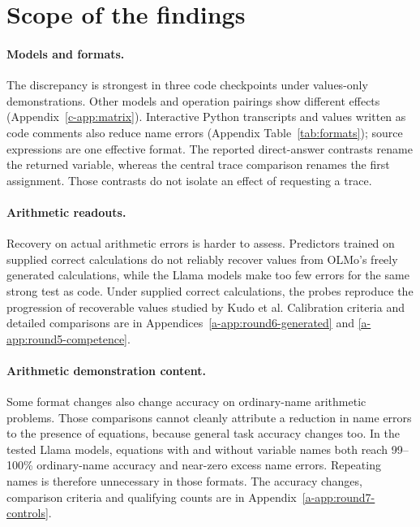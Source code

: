\documentclass[11pt]{article}
\begin{document}
\section{Scope of the findings}
\label{sec:scope}

\paragraph{Models and formats.} The discrepancy is strongest in three code
checkpoints under values-only demonstrations. Other models and operation
pairings show different effects (Appendix~\ref{c-app:matrix}). Interactive
Python transcripts and values written as code comments also reduce name errors
(Appendix Table~\ref{tab:formats}); source expressions are one effective format.
The reported direct-answer contrasts rename the returned variable, whereas
the central trace comparison renames the first assignment.
Those contrasts do not isolate an effect of requesting a trace.

\paragraph{Arithmetic readouts.} Recovery on actual arithmetic errors is harder
to assess. Predictors trained on supplied correct calculations do not reliably
recover values from OLMo's freely generated calculations, while the Llama models
make too few errors for the same strong test as code. Under supplied correct
calculations, the probes reproduce the progression of recoverable values studied
by Kudo et al. Calibration criteria and detailed comparisons are in
Appendices~\ref{a-app:round6-generated} and \ref{a-app:round5-competence}.

\paragraph{Arithmetic demonstration content.} Some format changes also change
accuracy on ordinary-name arithmetic problems. Those comparisons cannot cleanly
attribute a reduction in name errors to the presence of equations, because
general task accuracy changes too. In the tested Llama models, equations with
and without variable names both reach 99--100\% ordinary-name accuracy and
near-zero excess name errors. Repeating names is therefore unnecessary in those
formats. The accuracy changes, comparison criteria and qualifying counts are in
Appendix~\ref{a-app:round7-controls}.
\end{document}
